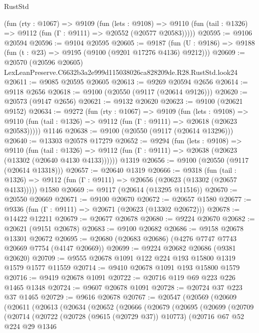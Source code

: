 \begin{lexlean}{RustStd}
\begin{coremodule}
    (fun (rty : @1067) =>
    @9109
      (fun (lets : @9108) =>
      @9110 (fun (tail : @1326) => @9112 (fun (Γ : @9111) => @20552 (@20577 @20583)))))
@20595 := @9106 @20594
@20596 := @9104 @20595
@20605 := @9187
    (fun (U : @9186) => @9188 (fun (t : @23) => @9195 (@9100 (@9201 @17276 @4136) @9212)))
@20609 := @20570
    (@20596 @20605)
    LexLeanPreserve.C6632b3a2e999d115038026ca828209de.R28.RustStd.look24
@20611 := @9085 @20595 @20605
@20613 := @9269 @20594 @2656
@20614 := @9118 @2656
@20618 := @9100 (@20550 (@9117 (@20614 @9126)))
@20620 := @20573 (@9147 @2656)
@20621 := @9132 @20620
@20623 := @9100 (@20621 @9152)
@20634 := @9272
    (fun (rty : @1067) =>
    @9109
      (fun (lets : @9108) =>
      @9110 (fun (tail : @1326) => @9112 (fun (Γ : @9111) => @20618 (@20623 @20583)))))
    @1146
@20638 := @9100 (@20550 (@9117 (@20614 @13296)))
@20640 := @13303 @20578 @17279
@20652 := @9294
    (fun (lets : @9108) =>
    @9110
      (fun (tail : @1326) =>
      @9112 (fun (Γ : @9111) => @20638 (@20623 (@13302 (@20640 @4130 @4133))))))
    @1319
@20656 := @9100 (@20550 (@9117 (@20614 @13318)))
@20657 := @20640 @1319
@20666 := @9318
    (fun (tail : @1326) => @9112 (fun (Γ : @9111) => @20656 (@20623 (@13302 (@20657 @4133)))))
    @1580
@20669 := @9117 (@20614 (@13295 @11516))
@20670 := @20550 @20669
@20671 := @9100 @20670
@20672 := @20657 @1580
@20677 := @9336 (fun (Γ : @9111) => @20671 (@20623 (@13302 @20672)))
@20678 := @14422 @12211
@20679 := @20677 @20678
@20680 := @9224 @20670
@20682 := @20621 (@9151 @20678)
@20683 := @9100 @20682
@20686 := @9158 @20678 @13301 @20672
@20695 := @20680 (@20683 @20686) (@4276 @7747 @7743 @20669 @7754 (@4147 @20669))
@20699 := @9224 @20682 @20686 (@9381 @20620)
@20709 := @9555 @20678 @1091 @122 @224 @193 @15800 @1319 @1579 @1577 @11559
@20714 := @9410 @20678 @1091 @193 @15800 @1579
@20716 := @9419 @20678 @1091
@20722 := @20716 @119 @69 @223 @226 @1465 @1348
@20724 := @9607 @20678 @1091
@20728 := @20724 @37 @223 @37 @1465
@20729 := @9616 @20678
@20767 := @20547
    (@20569
      (@20609
        (@20611
          (@20613
            (@20634
              (@20652
                (@20666
                  (@20679
                    (@20695
                      (@20699
                        (@20709
                          (@20714
                            (@20722
                              (@20728 (@9615 (@20729 @37)) @10773)
                              (@20716
                                @67
                                @52
                                @224
                                @29
                                @1346

\end{coremodule}
\end{lexlean}
